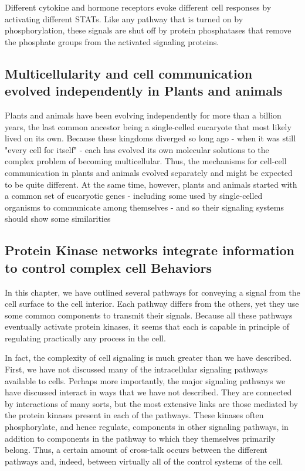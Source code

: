 Different cytokine and hormone receptors evoke different cell responses
by activating different STATs. Like any pathway that is turned on by
phosphorylation, these signals are shut off by protein phosphatases that
remove the phosphate groups from the activated signaling proteins.

\subsection{Multicellularity and cell communication evolved independently in Plants and animals}

Plants and animals have been evolving independently for more than a
billion years, the last common ancestor being a single-celled eucaryote
that most likely lived on its own. Because these kingdoms diverged so
long ago - when it was still "every cell for itself" - each has evolved its
own molecular solutions to the complex problem of becoming multicellular.
Thus, the mechanisms for cell-cell communication in plants and
animals evolved separately and might be expected to be quite different.
At the same time, however, plants and animals started with a common
set of eucaryotic genes - including some used by single-celled organisms
to communicate among themselves - and so their signaling systems
should show some similarities

\subsection{Protein Kinase networks integrate information to control complex cell Behaviors}

In this chapter, we have outlined several pathways for conveying a signal
from the cell surface to the cell interior. Each pathway differs from the others, yet they use
some common components to transmit their signals. Because all these
pathways eventually activate protein kinases, it seems that each is capable
in principle of regulating practically any process in the cell.

In fact, the complexity of cell signaling is much greater than we have
described. First, we have not discussed many of the intracellular signaling
pathways available to cells.
Perhaps more importantly, the major signaling pathways we have discussed
interact in ways that we have not described. They are connected
by interactions of many sorts, but the most extensive links are those
mediated by the protein kinases present in each of the pathways. These
kinases often phosphorylate, and hence regulate, components in other
signaling pathways, in addition to components in the pathway to which
they themselves primarily belong. Thus, a certain amount of cross-talk
occurs between the different pathways and, indeed,
between virtually all of the control systems of the cell.

